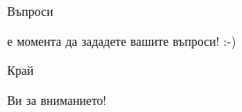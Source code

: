\documentclass{beamer}
\begin{document}
\begin{frame}{Въпроси}
  \transdissolve
  \begin{center}
     е момента да зададете вашите въпроси! :-)
  \end{center}
\end{frame}

\begin{frame}{Край}
  \transdissolve
  \begin{center}
     Ви за вниманието!
  \end{center}
\end{frame}
\end{document}
